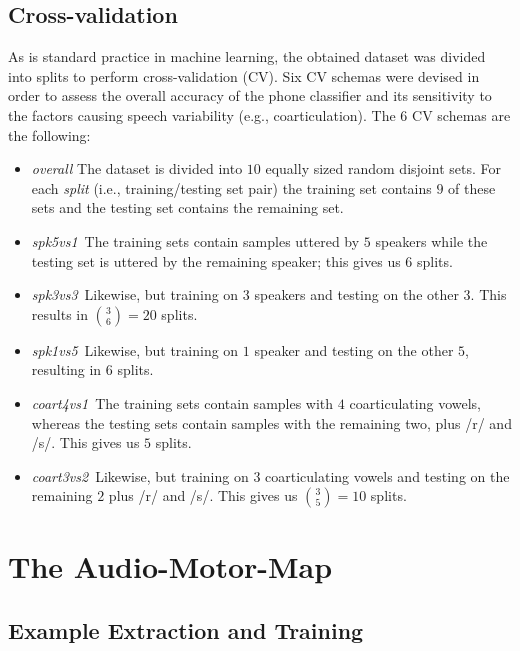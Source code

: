 \documentclass{pnastwo}
\newcommand{\spka}{\emph{spk5vs1}}
\newcommand{\spkb}{\emph{spk3vs3}}
\newcommand{\spkc}{\emph{spk1vs5}}
\newcommand{\coa}{\emph{coart4vs1}}
\newcommand{\cob}{\emph{coart3vs2}}
\begin{document}
\begin{article}
\subsection{Cross-validation}
\label{subsec:cv}

As is standard practice in machine learning, the obtained dataset was divided into
splits to perform cross-validation (CV). 
Six CV schemas were devised in order to assess the overall accuracy of the phone classifier and its
sensitivity to the factors causing speech variability (e.g., coarticulation). The $6$ CV schemas
are the following:

\begin{itemize}

 \item \emph{overall} The dataset is divided into $10$ equally sized random disjoint sets.
	For each \emph{split} (i.e., training/testing set pair) the training set contains $9$
	of these sets and the testing set contains the remaining set.

  \item \spka\ The training sets contain samples
  	uttered by $5$ speakers while the testing set is
  	uttered by the remaining speaker; this gives us $6$ splits.

  \item \spkb\ Likewise, but training on $3$ speakers and testing on the
  	other $3$. This results in $\binom{3}{6} = 20$ splits.

  \item \spkc\ Likewise, but training on $1$ speaker and testing on the
  	other $5$, resulting in $6$ splits.

  \item \coa\ The training sets contain samples
  	with $4$ coarticulating vowels, whereas the testing sets contain samples
  	with the remaining two, plus /r/ and /s/. This gives us $5$ splits.

  \item \cob\ Likewise, but training on $3$ coarticulating vowels and
  	testing on the remaining $2$ plus /r/ and /s/. This gives us
  	$\binom{3}{5} = 10$ splits.

\end{itemize}

\section{The Audio-Motor-Map}
\label{sec:rec}

\subsection{Example Extraction and Training}
\label{subsec:amm_setup}


\end{article}
\end{document}
